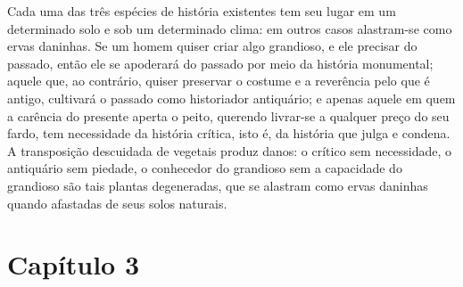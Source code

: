 Cada uma das três espécies de história existentes tem seu lugar em um
determinado solo e sob um determinado clima: em outros casos alastram-se
como ervas daninhas. Se um homem quiser criar algo grandioso, e ele
precisar do passado, então ele se apoderará do passado por meio da
história monumental; aquele que, ao contrário, quiser preservar o
costume e a reverência pelo que é antigo, cultivará o passado como
historiador antiquário; e apenas aquele em quem a carência do presente
aperta o peito, querendo livrar-se a qualquer preço do seu fardo, tem
necessidade da história crítica, isto é, da história que julga e
condena. A transposição descuidada de vegetais produz danos: o crítico
sem necessidade, o antiquário sem piedade, o conhecedor do grandioso sem
a capacidade do grandioso são tais plantas degeneradas, que se alastram
como ervas daninhas quando afastadas de seus solos naturais.

\chapter{Capítulo 3}\label{capuxedtulo-3}

